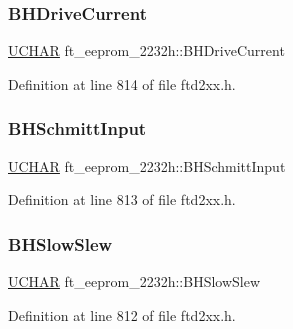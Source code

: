 \subsubsection{\texorpdfstring{B\+H\+Drive\+Current}{BHDriveCurrent}}
{\footnotesize\ttfamily \hyperlink{CatCaloProto40MHz_2inc_2WinTypes_8h_a4f4bb67531a9bf6f0b9c6ad76aeba587}{U\+C\+H\+AR} ft\+\_\+eeprom\+\_\+2232h\+::\+B\+H\+Drive\+Current}



Definition at line 814 of file ftd2xx.\+h.

\mbox{\label{structft__eeprom__2232h_a698ed4dae2f5efd99edcb349bc9d26dc}} 
\subsubsection{\texorpdfstring{B\+H\+Schmitt\+Input}{BHSchmittInput}}
{\footnotesize\ttfamily \hyperlink{CatCaloProto40MHz_2inc_2WinTypes_8h_a4f4bb67531a9bf6f0b9c6ad76aeba587}{U\+C\+H\+AR} ft\+\_\+eeprom\+\_\+2232h\+::\+B\+H\+Schmitt\+Input}



Definition at line 813 of file ftd2xx.\+h.

\mbox{\label{structft__eeprom__2232h_ab371dbca25fb1d51359031c74cd6821b}} 
\subsubsection{\texorpdfstring{B\+H\+Slow\+Slew}{BHSlowSlew}}
{\footnotesize\ttfamily \hyperlink{CatCaloProto40MHz_2inc_2WinTypes_8h_a4f4bb67531a9bf6f0b9c6ad76aeba587}{U\+C\+H\+AR} ft\+\_\+eeprom\+\_\+2232h\+::\+B\+H\+Slow\+Slew}



Definition at line 812 of file ftd2xx.\+h.

\mbox{\label{structft__eeprom__2232h_a1e713eb322844d1d45e0439087571133}} 
